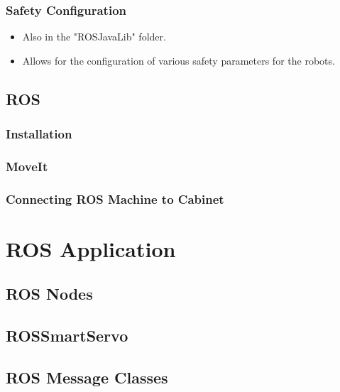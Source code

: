\documentclass[12pt, letterpaper]{article}
\begin{document}
\subsubsection{Safety Configuration}
\begin{itemize}
    \item Also in the "ROSJavaLib" folder.
    \item Allows for the configuration of various safety parameters for the robots.
\end{itemize}









\subsection{ROS}
\subsubsection{Installation}

\subsubsection{MoveIt}

\subsubsection{Connecting ROS Machine to Cabinet}










\section{ROS Application}
\subsection{ROS Nodes}

\subsection{ROSSmartServo}

\subsection{ROS Message Classes}
\end{document}

